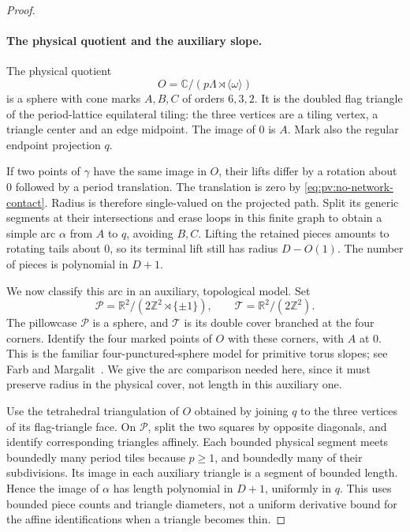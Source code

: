 \begin{proof}
\paragraph{The physical quotient and the auxiliary slope.}
The physical quotient
\[
 O=\mathbb C/(p\Lambda\rtimes\langle\omega\rangle)
\]
is a sphere with cone marks \(A,B,C\) of orders \(6,3,2\). It is the doubled
flag triangle of the period-lattice equilateral tiling: the three vertices
are a tiling vertex, a triangle center and an edge midpoint. The image of 0
is \(A\). Mark also the regular endpoint projection \(q\).

If two points of \(\gamma\) have the same image in \(O\), their lifts differ
by a rotation about 0 followed by a period translation. The translation is
zero by \eqref{eq:pv:no-network-contact}. Radius is therefore single-valued
on the projected path. Split its generic segments at their intersections
and erase loops in this finite graph to obtain a simple arc \(\alpha\) from
\(A\) to \(q\), avoiding \(B,C\). Lifting the retained pieces amounts to
rotating tails about 0, so its terminal lift still has radius \(D-O(1)\).
The number of pieces is polynomial in \(D+1\).

We now classify this arc in an auxiliary, topological model. Set
\[
 \mathcal P=\mathbb R^2/(2\mathbb Z^2\rtimes\{\pm1\}),\qquad
 \mathcal T=\mathbb R^2/(2\mathbb Z^2).
\]
The pillowcase \(\mathcal P\) is a sphere, and \(\mathcal T\) is its double
cover branched at the four corners. Identify the four marked points of
\(O\) with these corners, with \(A\) at 0. This is the familiar
four-punctured-sphere model for primitive torus slopes; see
Farb and Margalit~\cite[Sections~1.2 and~2.2.5]{FarbMargalit2012}. We give the
arc comparison needed here, since it must preserve radius in the physical
cover, not length in this auxiliary one.



Use the tetrahedral triangulation of \(O\) obtained by joining \(q\) to the
three vertices of its flag-triangle face. On \(\mathcal P\), split the two
squares by opposite diagonals, and identify corresponding triangles
affinely. Each bounded physical segment meets boundedly many period tiles
because \(p\ge1\), and boundedly many of their subdivisions. Its image in
each auxiliary triangle is a segment of bounded length. Hence the image of
\(\alpha\) has length polynomial in \(D+1\), uniformly in \(q\). This uses
bounded piece counts and triangle diameters, not a uniform derivative bound
for the affine identifications when a triangle becomes thin.


\end{proof}
